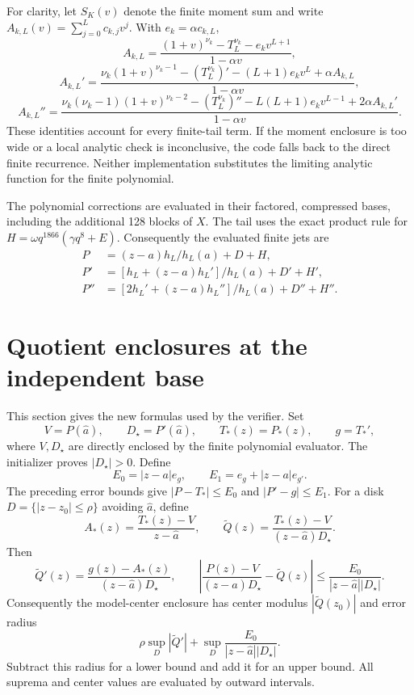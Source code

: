 \documentclass[11pt,a4paper]{article}
\newcommand{\astar}{\widehat a}
\begin{document}
For clarity, let $S_K(v)$ denote the finite moment sum and write
$A_{k,L}(v)=\sum_{j=0}^Lc_{k,j}v^j$. With $e_k=\alpha c_{k,L}$,
\[
 A_{k,L}=\frac{(1+v)^{\nu_k}-T_L^{\nu_k}-e_kv^{L+1}}{1-\alpha v},
\]
\[
 A_{k,L}'=\frac{\nu_k(1+v)^{\nu_k-1}-(T_L^{\nu_k})'
                -(L+1)e_kv^L+\alpha A_{k,L}}{1-\alpha v},
\]
\[
 A_{k,L}''=\frac{\nu_k(\nu_k-1)(1+v)^{\nu_k-2}-(T_L^{\nu_k})''
          -L(L+1)e_kv^{L-1}+2\alpha A_{k,L}'}{1-\alpha v}.
\]
These identities account for every finite-tail term. If the moment enclosure
is too wide or a local analytic check is inconclusive, the code falls back to
the direct finite recurrence. Neither implementation substitutes the limiting
analytic function for the finite polynomial.

The polynomial corrections are evaluated in their factored, compressed bases,
including the additional 128 blocks of $X$. The tail uses the exact product
rule for $H=\omega q^{1866}(\gamma q^8+E)$. Consequently the evaluated finite jets are
\[
\begin{aligned}
 P&=(z-a)h_L/h_L(a)+D+H,\\
 P'&=[h_L+(z-a)h_L']/h_L(a)+D'+H',\\
 P''&=[2h_L'+(z-a)h_L'']/h_L(a)+D''+H''.
\end{aligned}
\]



\section{Quotient enclosures at the independent base}\label{sec:values}
This section gives the new formulas used by the verifier. Set
\[
 V=P(\astar),\qquad D_\star=P'(\astar),\qquad
 T_*(z)=P_*(z),\qquad g=T_*',
\]
where $V,D_\star$ are directly enclosed by the finite polynomial evaluator.
The initializer proves $|D_\star|>0$. Define
\[
 E_0=|z-a|e_g,\qquad E_1=e_g+|z-a|e_{g'}.
\]
The preceding error bounds give $|P-T_*|\le E_0$ and $|P'-g|\le E_1$.
For a disk $D=\{|z-z_0|\le\rho\}$ avoiding $\astar$, define
\[
 A_*(z)=\frac{T_*(z)-V}{z-\astar},\qquad
 \widetilde Q(z)=\frac{T_*(z)-V}{(z-\astar)D_\star}.
\]
Then
\[
 \widetilde Q'(z)=\frac{g(z)-A_*(z)}{(z-\astar)D_\star},
 \qquad
 \left|\frac{P(z)-V}{(z-\astar)D_\star}-\widetilde Q(z)\right|
 \le\frac{E_0}{|z-\astar||D_\star|}.
\]
Consequently the model-center enclosure has center modulus
$|\widetilde Q(z_0)|$ and error radius
\begin{equation}\label{eq:model-value}
 \rho\sup_D|\widetilde Q'|
 +\sup_D\frac{E_0}{|z-\astar||D_\star|}.
\end{equation}
Subtract this radius for a lower bound and add it for an upper bound.
All suprema and center values are evaluated by outward intervals.
\end{document}
